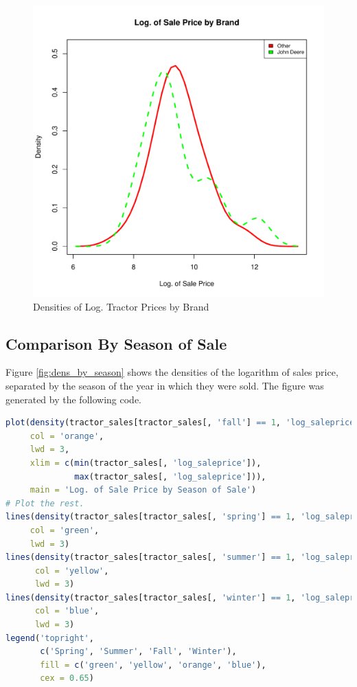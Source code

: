 \documentclass[11pt]{book}
\begin{document}
\begin{figure}[h!]
  \centering
  \includegraphics[scale = 0.5, keepaspectratio=true]{../Figures/dens_by_brand}
  \caption{Densities of Log. Tractor Prices by Brand} \label{fig:dens_by_brand}
\end{figure}


\pagebreak
\subsection{Comparison By Season of Sale}

Figure \ref{fig:dens_by_season} shows
the densities of the logarithm of sales price,
separated by the season of the year in which they were sold.
The figure was generated by the following code.
%
\vfill

\begin{lstlisting}[language=R]
plot(density(tractor_sales[tractor_sales[, 'fall'] == 1, 'log_saleprice']),
     col = 'orange',
     lwd = 3,
     xlim = c(min(tractor_sales[, 'log_saleprice']),
              max(tractor_sales[, 'log_saleprice'])),
     main = 'Log. of Sale Price by Season of Sale')
# Plot the rest.
lines(density(tractor_sales[tractor_sales[, 'spring'] == 1, 'log_saleprice']),
     col = 'green',
     lwd = 3)
lines(density(tractor_sales[tractor_sales[, 'summer'] == 1, 'log_saleprice']),
      col = 'yellow',
      lwd = 3)
lines(density(tractor_sales[tractor_sales[, 'winter'] == 1, 'log_saleprice']),
      col = 'blue',
      lwd = 3)
legend('topright',
       c('Spring', 'Summer', 'Fall', 'Winter'),
       fill = c('green', 'yellow', 'orange', 'blue'),
       cex = 0.65)
\end{lstlisting}
\end{document}
